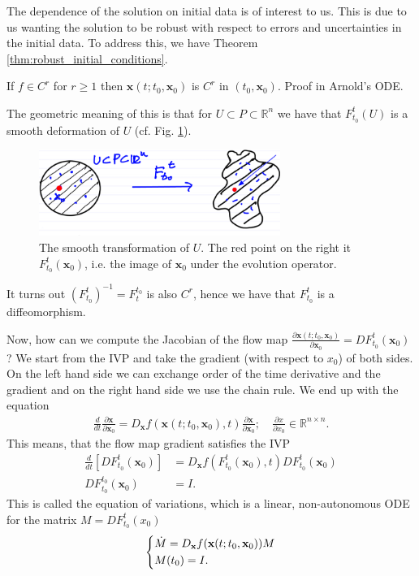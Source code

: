 The dependence of the solution on initial data is of interest to us. This is due to us wanting the solution to be robust with respect to errors and uncertainties in the initial data. To address this, we have Theorem \ref{thm:robust_initial_conditions}.
\begin{theorem}[]
	If $f \in C^r$ for $r\geq 1$ then $ \textbf{x}(t; t_0,  \textbf{x}_0)$ is $C^r$ in $(t_0,  \textbf{x}_0)$. Proof in Arnold's ODE.
	\label{thm:robust_initial_conditions}
\end{theorem}

The geometric meaning of this is that for $U \subset P \subset \mathbb{R}^{n}$ we have that $F_{t_0}^{t}(U)$ is a smooth deformation of $U$ (cf. Fig. \ref{fig:deformation}).
\begin{figure}[h!]
	\centering
	\includegraphics[width=0.7\textwidth]{figures/ch1/7smooth_transform.png}
	\caption{The smooth transformation of $U$. The red point on the right it $F _{t_0}^t( \textbf{x}_0)$, i.e. the image of $ \textbf{x}_0$ under the evolution operator.}
	\label{fig:deformation}
\end{figure}
It turns out $\left(F_{t_0}^{t}\right)^{-1} = F_{t}^{t_0}$ is also $C^r$, hence we have that $F_{t_0}^{t}$ is a diffeomorphism. 

Now, how can we compute the Jacobian of the flow map $\frac{\partial  \textbf{x}(t; t_0,  \textbf{x}_0)}{ \partial  \textbf{x}_0} = DF _{t_0}^{t}( \textbf{x}_0)$? We start from the IVP and take the gradient (with respect to $x_0$) of both sides. On the left hand side we can exchange order of the time derivative and the gradient and on the right hand side we use the chain rule. We end up with the equation
\begin{align}
	\frac{d}{dt}\frac{\partial  \textbf{x}}{\partial  \textbf{x}_0} = D_ \textbf{x} f( \textbf{x}(t; t_0,  \textbf{x}_0), t) \frac{\partial  \textbf{x}}{\partial  \textbf{x}_0}; \quad \frac{\partial x}{\partial x_0} \in \mathbb{R}^{n \times n}.
\end{align}
This means, that the flow map gradient satisfies the IVP
\begin{align}
	\frac{d}{dt}\left[ DF_{t_0}^{t}( \textbf{x}_0)\right] &= D_{ \textbf{x}}f(F_{t_0}^{t}( \textbf{x}_0), t) DF_{t_0}^{t}( \textbf{x}_0) \\
	DF_{t_0}^{t_0}( \textbf{x}_0) &= I.
\end{align}
This is called the equation of variations, which is a linear, non-autonomous ODE for the matrix $M = DF_{t_0}^{t}(x_0)$
\begin{align}
	\begin{dcases}
		\dot{M} = D_ \textbf{x} f( \textbf{x}(t; t_0,  \textbf{x}_0)) M \\ M(t_0) = I.
	\end{dcases}
\end{align}

